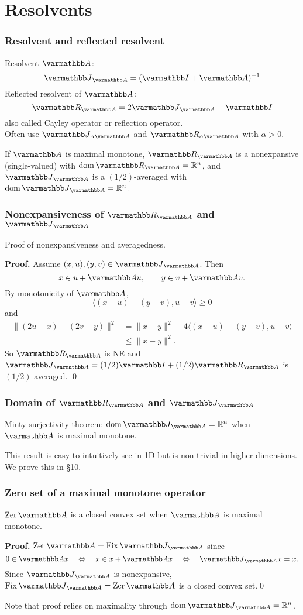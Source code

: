 \documentclass[10pt,mathserif]{beamer}
\begin{document}
\section{Resolvents}
\begin{frame}
\frametitle{Resolvent and reflected resolvent}
Resolvent $\opA$:
\[
\opJ_{\opA}= (\opI+\opA)^{-1}
\]
Reflected resolvent of $\opA$:
\[
\opR_{\opA} = 2\opJ_{\opA}-\opI
\]
also called Cayley operator or reflection operator.\\
Often use $\opJ_{\alpha \opA}$ and $\opR_{\alpha \opA}$ with $\alpha>0$.
\vspace{0.2in}


If $\opA$ is maximal monotone,
$\opR_\opA$ is a nonexpansive (single-valued) with $\dom \opR_\opA=\reals^n$,
and
$\opJ_\opA$ is a $(1/2)$-averaged with $\dom \opJ_\opA=\reals^n$.
\end{frame}


\begin{frame}
\frametitle{Nonexpansiveness of $\opR_\opA$ and $\opJ_\opA$}
Proof of nonexpansiveness and averagedness.
\vspace{0.2in}

\textbf{Proof.}
Assume $(x,u),(y,v)\in \opJ_\opA$. Then
\[
x\in u + \opA u,\qquad
y\in v+\opA v.
\]
By monotonicity of $\opA$,
\[
\langle(x-u)-(y-v),
u-v
\rangle\ge 0
\]
and
\begin{align*}
\|(2u-x)-(2v-y)\|^2
 &= \|x-y\|^2 - 4
 \langle(x-u)-(y-v),
u-v
\rangle\\
&\le \|x-y\|^2.
\end{align*}
So $\opR_\opA$ is NE and $\opJ_\opA=(1/2)\opI+(1/2)\opR_\opA$ is $(1/2)$-averaged.
\qed
\end{frame}


\begin{frame}
\frametitle{Domain of $\opR_\opA$ and $\opJ_\opA$}

Minty surjectivity theorem: $\dom \opJ_\opA=\reals^n$ when $\opA$ is maximal monotone.
\vspace{0.2in}


This result is easy to intuitively see in 1D but is non-trivial in higher dimensions.
We prove this in  \S10.

\end{frame}

\begin{frame}
\frametitle{Zero set of a maximal monotone operator}
$\zer \opA$ is a closed convex set when $\opA$ is maximal monotone.

\vspace{0.2in}
\textbf{Proof.}
$\zer \opA=\fix \opJ_\opA $ since
\[
0\in \opA x
\quad\Leftrightarrow\quad
x\in x+\opA x
\quad\Leftrightarrow\quad
\opJ_\opA x = x.
\]
Since $\opJ_\opA$ is nonexpansive, $\fix \opJ_\opA=\zer \opA$ is a closed convex set.\qed
\vspace{0.2in}

Note that proof relies on maximality through $\dom \opJ_\opA=\reals^n$.
\end{frame}
\end{document}

